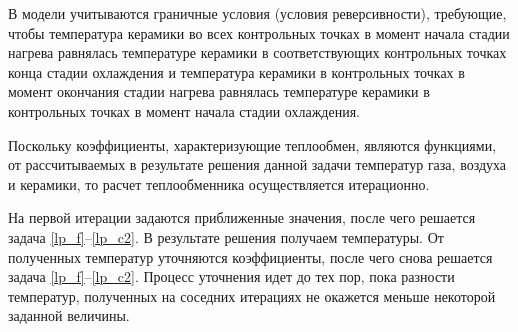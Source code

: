 \documentclass[a4paper,11pt,numreferences,mathsec,kaplist]{isuepsutf8}
\begin{document}
\begin{article}
В модели учитываются граничные условия (условия реверсивности),
требующие, чтобы температура керамики во всех контрольных точках в
момент начала стадии нагрева равнялась температуре керамики в
соответствующих контрольных точках конца стадии охлаждения и
температура керамики в контрольных точках в момент окончания стадии
нагрева равнялась температуре керамики в контрольных точках в момент
начала стадии охлаждения. 

Поскольку коэффициенты, характеризующие теплообмен, являются функциями, от
рассчитываемых в результате решения данной задачи температур газа, воздуха
и керамики, то расчет теплообменника осуществляется итерационно.

На первой итерации задаются приближенные значения, после чего решается
задача \eqref{lp_f}--\eqref{lp_c2}. В результате решения получаем
температуры. От полученных температур уточняются коэффициенты, после
чего снова решается задача \eqref{lp_f}--\eqref{lp_c2}. Процесс
уточнения идет до тех пор, пока разности температур, полученных на
соседних итерациях не окажется меньше некоторой заданной величины.


\end{article}
\end{document}
